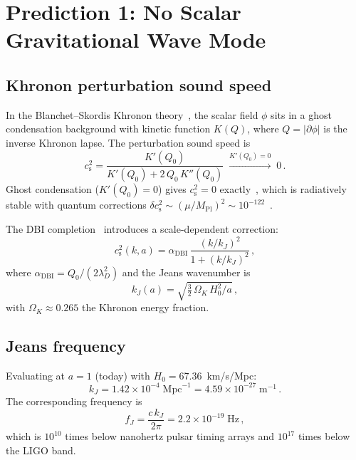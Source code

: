 \documentclass[prl,twocolumn,superscriptaddress,longbibliography]{revtex4-2}
\newcommand{\cs}{c_{\mathrm{s}}}
\begin{document}
\section{Prediction 1: No Scalar Gravitational Wave Mode}
\label{sec:scalar}

\subsection{Khronon perturbation sound speed}

In the Blanchet--Skordis Khronon theory~\cite{BS2024,BS2025},
the scalar field $\phi$ sits in a ghost condensation background
with kinetic function $K(Q)$, where $Q = |\partial\phi|$ is the
inverse Khronon lapse.  The perturbation sound speed is
\begin{equation}
  \cs^2 = \frac{K'(Q_0)}{K'(Q_0) + 2\,Q_0\,K''(Q_0)}
  \;\xrightarrow{K'(Q_0) = 0}\; 0\,.
  \label{eq:cs2}
\end{equation}
Ghost condensation ($K'(Q_0) = 0$) gives $\cs^2 = 0$
exactly~\cite{AHCLM2004}, which is radiatively stable with
quantum corrections $\delta\cs^2 \sim (\mu/M_{\mathrm{Pl}})^2
\sim 10^{-122}$~\cite{Paper3}.

The DBI completion~\cite{BS2024} introduces a scale-dependent
correction:
\begin{equation}
  \cs^2(k,a) = \alpha_{\mathrm{DBI}}\,
  \frac{(k/k_J)^2}{1 + (k/k_J)^2}\,,
  \label{eq:cs2_DBI}
\end{equation}
where $\alpha_{\mathrm{DBI}} = Q_0/(2\lambda_D^2)$ and the
Jeans wavenumber is
\begin{equation}
  k_J(a) = \sqrt{\tfrac{3}{2}\,\Omega_K\,H_0^2/a}\,,
  \label{eq:kJ}
\end{equation}
with $\Omega_K \approx 0.265$ the Khronon energy fraction.

\subsection{Jeans frequency}

Evaluating at $a = 1$ (today) with $H_0 = 67.36$~km/s/Mpc:
\begin{equation}
  k_J = 1.42 \times 10^{-4}\;\mathrm{Mpc}^{-1}
  = 4.59 \times 10^{-27}\;\mathrm{m}^{-1}\,.
\end{equation}
The corresponding frequency is
\begin{equation}
  \boxed{f_J = \frac{c\,k_J}{2\pi}
  = 2.2 \times 10^{-19}\;\mathrm{Hz}}\,,
  \label{eq:fJ}
\end{equation}
which is $10^{10}$ times below nanohertz pulsar timing
arrays and $10^{17}$ times below the LIGO band.
\end{document}
